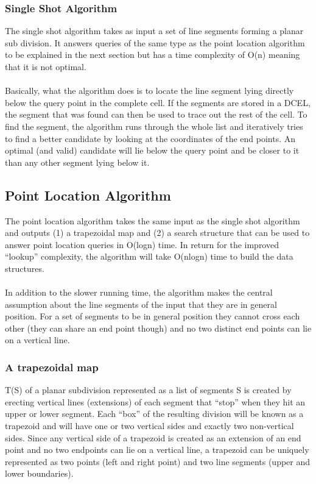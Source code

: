 \subsubsection{Single Shot Algorithm}
The single shot algorithm takes as input a set of line segments forming a planar sub division. It answers queries of the same type as the point location algorithm to be explained in the next section but has a time complexity of O(n) meaning that it is not optimal. 

\paragraph{}
Basically, what the algorithm does is to locate the line segment lying directly below the query point in the complete cell. If the segments are stored in a DCEL, the segment that was found can then be used to trace out the rest of the cell. To find the segment, the algorithm runs through the whole list and iteratively tries to find a better candidate by looking at the coordinates of the end points. An optimal (and valid) candidate will lie below the query point and be closer to it than any other segment lying below it. 

\subsection{Point Location Algorithm}
The point location algorithm takes the same input as the single shot algorithm and outputs (1) a trapezoidal map and (2) a search structure that can be used to answer point location queries in O(logn) time. In return for the improved “lookup” complexity, the algorithm will take O(nlogn) time to build the data structures. 

\paragraph{}
In addition to the slower running time, the algorithm makes the central assumption about the line segments of the input that they are in general position. For a set of segments to be in general position they cannot cross each other (they can share an end point though) and no two distinct end points can lie on a vertical line.

\subsubsection{A trapezoidal map}
T(S) of a planar subdivision represented as a list of segments S is created by erecting vertical lines (extensions) of each segment that “stop” when they hit an upper or lower segment. Each “box” of the resulting division will be known as a trapezoid and will have one or two vertical sides and exactly two non-vertical sides. Since any vertical side of a trapezoid is created as an extension of an end point and no two endpoints can lie on a vertical line, a trapezoid can be uniquely represented as two points (left and right point) and two line segments (upper and lower boundaries).

